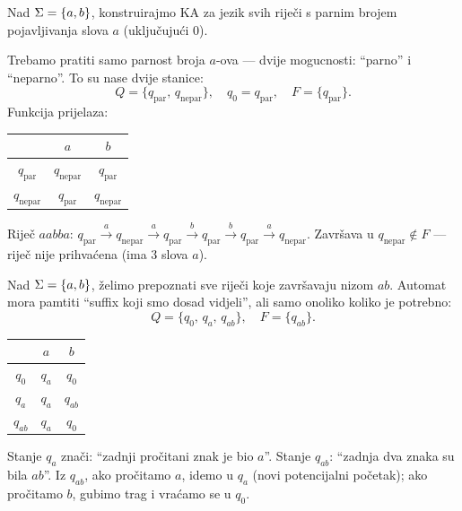 \begin{primjer}
Nad $\Sigma = \{a, b\}$, konstruirajmo KA za jezik svih riječi s
parnim brojem pojavljivanja slova $a$ (uključujući $0$).

Trebamo pratiti samo parnost broja $a$-ova --- dvije mogucnosti:
``parno'' i ``neparno''. To su nase dvije stanice:
\[
  Q = \{q_{\text{par}},\, q_{\text{nepar}}\},
  \quad q_0 = q_{\text{par}},
  \quad F = \{q_{\text{par}}\}.
\]
Funkcija prijelaza:
\begin{center}
\renewcommand{\arraystretch}{1.4}
\begin{tabular}{c|cc}
  & $a$ & $b$ \\ \hline
  $q_{\text{par}}$   & $q_{\text{nepar}}$ & $q_{\text{par}}$ \\
  $q_{\text{nepar}}$ & $q_{\text{par}}$   & $q_{\text{nepar}}$ \\
\end{tabular}
\end{center}
Riječ $aabba$: $q_{\text{par}} \xrightarrow{a} q_{\text{nepar}}
\xrightarrow{a} q_{\text{par}} \xrightarrow{b} q_{\text{par}}
\xrightarrow{b} q_{\text{par}} \xrightarrow{a} q_{\text{nepar}}$.
Završava u $q_{\text{nepar}} \notin F$ --- riječ nije prihvaćena (ima $3$ slova $a$). \checkmark
\end{primjer}

\begin{primjer}
Nad $\Sigma = \{a, b\}$, želimo prepoznati sve riječi koje završavaju
nizom $ab$. Automat mora pamtiti ``suffix koji smo dosad vidjeli'',
ali samo onoliko koliko je potrebno:
\[
  Q = \{q_0,\, q_a,\, q_{ab}\}, \quad F = \{q_{ab}\}.
\]
\begin{center}
\renewcommand{\arraystretch}{1.4}
\begin{tabular}{c|cc}
  & $a$ & $b$ \\ \hline
  $q_0$  & $q_a$  & $q_0$ \\
  $q_a$  & $q_a$  & $q_{ab}$ \\
  $q_{ab}$ & $q_a$ & $q_0$ \\
\end{tabular}
\end{center}
Stanje $q_a$ znači: ``zadnji pročitani znak je bio $a$''. Stanje $q_{ab}$:
``zadnja dva znaka su bila $ab$''. Iz $q_{ab}$, ako pročitamo $a$, idemo
u $q_a$ (novi potencijalni početak); ako pročitamo $b$, gubimo trag
i vraćamo se u $q_0$.
\end{primjer}

